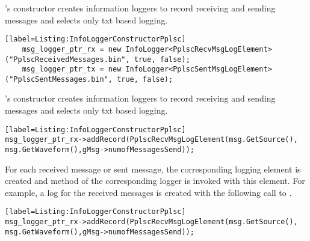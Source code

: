 's constructor creates information loggers to record receiving and sending messages and selects only txt based logging. 

\begin{lstlisting}[style=boralargefileNoNumbers][label=Listing:InfoLoggerConstructorPplsc]
	msg_logger_ptr_rx = new InfoLogger<PplscRecvMsgLogElement>("PplscReceivedMessages.bin", true, false);
	msg_logger_ptr_tx = new InfoLogger<PplscSentMsgLogElement>("PplscSentMessages.bin", true, false);
\end{lstlisting}

's constructor creates information loggers to record receiving and sending messages and selects only txt based logging. 

\begin{lstlisting}[style=boralargefileNoNumbers][label=Listing:InfoLoggerConstructorPplsc]
msg_logger_ptr_rx->addRecord(PplscRecvMsgLogElement(msg.GetSource(), msg.GetWaveform(),gMsg->numofMessagesSend));
\end{lstlisting}

For each received message or sent message, the corresponding logging element is created and  method of the corresponding logger is invoked with this element. For example, a log for the received messages is created with the following call to .
\begin{lstlisting}[style=boralargefileNoNumbers][label=Listing:InfoLoggerConstructorPplsc]
msg_logger_ptr_rx->addRecord(PplscRecvMsgLogElement(msg.GetSource(), msg.GetWaveform(),gMsg->numofMessagesSend));
\end{lstlisting}
